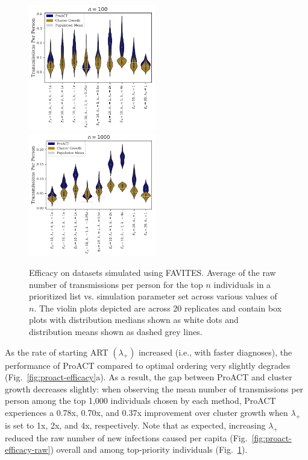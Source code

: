 \begin{figure} %
\centering
\includegraphics[width=0.495\textwidth]{figs/proact-efficacy-vs-n-100}
\includegraphics[width=0.495\textwidth]{figs/proact-efficacy-vs-n-1000}
\caption[Raw ProACT Performance vs. Number of Individuals]
{Efficacy on datasets simulated using FAVITES. Average of the raw number of transmissions per person for the top $n$ individuals in a prioritized list vs. simulation parameter set across various values of $n$. The violin plots depicted are across 20 replicates and contain box plots with distribution medians shown as white dots and distribution means shown as dashed grey lines.}
\label{fig:proact-efficacy-vs-n}
\end{figure}

As the rate of starting \gls{ART} $\left(\lambda_{+}\right)$ increased (i.e., with faster diagnoses), the performance of ProACT compared to optimal ordering very slightly degrades (Fig.~\ref{fig:proact-efficacy}a). As a result, the gap between ProACT and cluster growth decreases slightly: when observing the mean number of transmissions per person among the top 1,000 individuals chosen by each method, ProACT experiences a 0.78x, 0.70x, and 0.37x improvement over cluster growth when $\lambda_{+}$ is set to 1x, 2x, and 4x, respectively. Note that as expected, increasing $\lambda_{+}$ reduced the raw number of new infections caused per capita (Fig.~\ref{fig:proact-efficacy-raw}) overall and among top-priority individuals (Fig.~\ref{fig:proact-efficacy-vs-n}).

